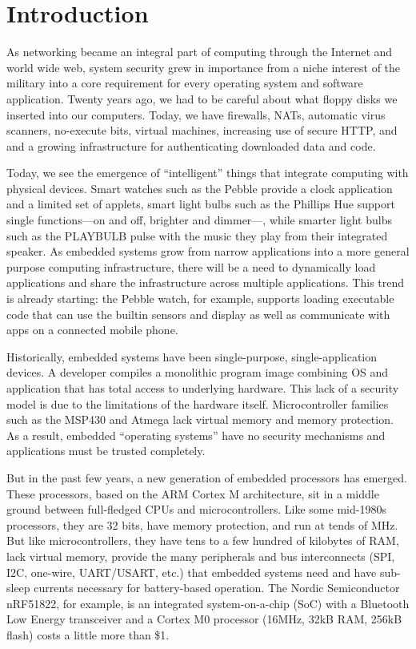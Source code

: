 \section{Introduction}

As networking became an integral part of computing through the Internet and
world wide web, system security grew in importance from a niche interest
of the military into a core requirement for every operating system and 
software application. Twenty years ago, we had to be careful about what
floppy disks we inserted into our computers. Today, we have firewalls,
NATs, automatic virus scanners, no-execute bits, virtual machines, 
increasing use of secure HTTP, and and a growing infrastructure for 
authenticating downloaded data and code.

Today, we see the emergence of ``intelligent'' things that integrate
computing with physical devices. Smart watches such as the Pebble
provide a clock application and a limited set of applets, smart light
bulbs such as the Phillips Hue support single functions---on and off,
brighter and dimmer---, while smarter light bulbs such as the PLAYBULB
pulse with the music they play from their integrated speaker.  As
embedded systems grow from narrow applications into a more general
purpose computing infrastructure, there will be a need to dynamically
load applications and share the infrastructure across multiple
applications.  This trend is already starting: the Pebble watch, for
example, supports loading executable code that can use the builtin
sensors and display as well as communicate with apps on a connected
mobile phone.

Historically, embedded systems have been single-purpose,
single-application devices.  A developer compiles a monolithic program
image combining OS and application that has total access to
underlying hardware.  This lack of a security model is due to the
limitations of the hardware itself. Microcontroller families such as
the MSP430 and Atmega lack virtual memory and memory protection.  As a
result, embedded ``operating systems'' have no security mechanisms and
applications must be trusted completely.

But in the past few years, a new generation of embedded processors
has emerged. These processors, based on the ARM Cortex M architecture,
sit in a middle ground between full-fledged CPUs and microcontrollers.
Like some mid-1980s processors, they are 32 bits, have memory protection, and
run at tends of MHz. But like microcontrollers, they have tens to
a few hundred of kilobytes of RAM, lack virtual memory,
provide the many peripherals
and bus interconnects (SPI, I2C, one-wire, UART/USART, etc.) that embedded
systems need and 
have sub-\uA sleep currents necessary for battery-based operation.
The Nordic Semiconductor nRF51822, for example,
is an integrated system-on-a-chip (SoC) with a Bluetooth Low Energy 
transceiver and a Cortex M0 processor (16MHz, 32kB RAM, 256kB flash)
costs a little more than \$1. 

